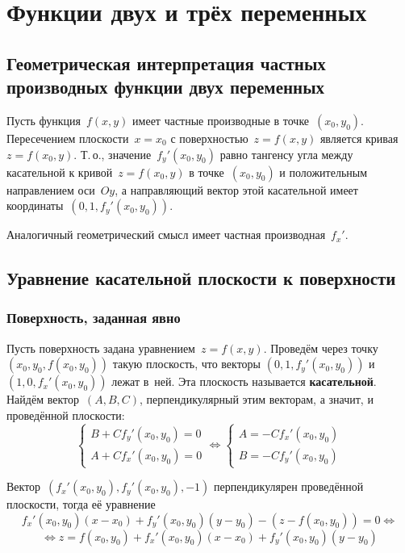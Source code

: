 \section{Функции двух и трёх переменных}
\subsection{Геометрическая интерпретация частных производных функции двух переменных}
Пусть функция~$f(x, y)$ имеет частные производные в точке~$(x_0, y_0)$.
Пересечением плоскости~$x = x_0$ с поверхностью~$z = f(x, y)$ является кривая~$z = f(x_0, y)$.
Т.\,о., значение~$f_y'(x_0, y_0)$ равно тангенсу угла между касательной к кривой~$z = f(x_0, y)$ в точке~$(x_0, y_0)$ и положительным направлением оси~$Oy$, а направляющий вектор этой касательной имеет координаты~$(0, 1, f_y'(x_0, y_0))$.

Аналогичный геометрический смысл имеет частная производная~$f_x'$.

\subsection{Уравнение касательной плоскости к поверхности}
\subsubsection{Поверхность, заданная явно}
Пусть поверхность задана уравнением~$z = f(x, y)$.
Проведём через точку~$(x_0, y_0, f(x_0, y_0))$ такую плоскость, что векторы $(0, 1, f_y'(x_0, y_0))$ и $(1, 0, f_x'(x_0, y_0))$ лежат в~ней.
Эта плоскость называется \textbf{касательной}.
Найдём вектор~$(A, B, C)$, перпендикулярный этим векторам, а значит, и проведённой плоскости:
\begin{equation*}
\begin{cases}
B + C f_y'(x_0, y_0) = 0 \\
A + C f_x'(x_0, y_0) = 0
\end{cases} \Leftrightarrow
\begin{cases}
A = -C f_x'(x_0, y_0) \\
B = -C f_y'(x_0, y_0)
\end{cases}
\end{equation*}

Вектор~$(f_x'(x_0, y_0), f_y'(x_0, y_0), -1)$ перпендикулярен проведённой плоскости, тогда её уравнение
\begin{equation*}
f_x'(x_0, y_0)(x - x_0) + f_y'(x_0, y_0)(y - y_0) - (z - f(x_0, y_0)) = 0 \Leftrightarrow
\end{equation*}
\begin{equation}
\label{eq:tangent_plane}
\Leftrightarrow z = f(x_0, y_0) + f_x'(x_0, y_0)(x - x_0) + f_y'(x_0, y_0)(y - y_0)
\end{equation}

